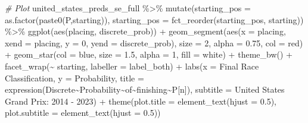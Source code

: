 \documentclass[
]{book}
\newenvironment{Shaded}{\begin{snugshade}}{\end{snugshade}}
\newcommand{\AttributeTok}[1]{\textcolor[rgb]{0.77,0.63,0.00}{#1}}
\newcommand{\CommentTok}[1]{\textcolor[rgb]{0.56,0.35,0.01}{\textit{#1}}}
\newcommand{\DecValTok}[1]{\textcolor[rgb]{0.00,0.00,0.81}{#1}}
\newcommand{\FloatTok}[1]{\textcolor[rgb]{0.00,0.00,0.81}{#1}}
\newcommand{\FunctionTok}[1]{\textcolor[rgb]{0.00,0.00,0.00}{#1}}
\newcommand{\NormalTok}[1]{#1}
\newcommand{\SpecialCharTok}[1]{\textcolor[rgb]{0.00,0.00,0.00}{#1}}
\newcommand{\StringTok}[1]{\textcolor[rgb]{0.31,0.60,0.02}{#1}}
\begin{document}
\begin{Shaded}
\begin{Highlighting}[]
\CommentTok{\# Plot}
\NormalTok{united\_states\_preds\_se\_full }\SpecialCharTok{\%\textgreater{}\%}
  \FunctionTok{mutate}\NormalTok{(}\AttributeTok{starting\_pos =} \FunctionTok{as.factor}\NormalTok{(}\FunctionTok{paste0}\NormalTok{(}\StringTok{\textquotesingle{}P\textquotesingle{}}\NormalTok{,starting)),}
         \AttributeTok{starting\_pos =} \FunctionTok{fct\_reorder}\NormalTok{(starting\_pos, starting)) }\SpecialCharTok{\%\textgreater{}\%}
  \FunctionTok{ggplot}\NormalTok{(}\FunctionTok{aes}\NormalTok{(placing, discrete\_prob)) }\SpecialCharTok{+}
  \FunctionTok{geom\_segment}\NormalTok{(}\FunctionTok{aes}\NormalTok{(}\AttributeTok{x =}\NormalTok{ placing, }\AttributeTok{xend =}\NormalTok{ placing, }\AttributeTok{y =} \DecValTok{0}\NormalTok{, }\AttributeTok{yend =}\NormalTok{ discrete\_prob),}
               \AttributeTok{size =} \DecValTok{2}\NormalTok{, }\AttributeTok{alpha =} \FloatTok{0.75}\NormalTok{, }\AttributeTok{col =} \StringTok{\textquotesingle{}red\textquotesingle{}}\NormalTok{) }\SpecialCharTok{+}
  \FunctionTok{geom\_star}\NormalTok{(}\AttributeTok{col =} \StringTok{\textquotesingle{}blue\textquotesingle{}}\NormalTok{, }\AttributeTok{size =} \FloatTok{1.5}\NormalTok{, }\AttributeTok{alpha =} \DecValTok{1}\NormalTok{, }\AttributeTok{fill =} \StringTok{\textquotesingle{}white\textquotesingle{}}\NormalTok{) }\SpecialCharTok{+}
  \FunctionTok{theme\_bw}\NormalTok{() }\SpecialCharTok{+}
  \FunctionTok{facet\_wrap}\NormalTok{(}\SpecialCharTok{\textasciitilde{}}\NormalTok{ starting, }\AttributeTok{labeller =}\NormalTok{ label\_both) }\SpecialCharTok{+}
  \FunctionTok{labs}\NormalTok{(}\AttributeTok{x =} \StringTok{\textquotesingle{}Final Race Classification\textquotesingle{}}\NormalTok{,}
       \AttributeTok{y =} \StringTok{\textquotesingle{}Probability\textquotesingle{}}\NormalTok{,}
       \AttributeTok{title =} \FunctionTok{expression}\NormalTok{(Discrete}\SpecialCharTok{\textasciitilde{}}\NormalTok{Probability}\SpecialCharTok{\textasciitilde{}}\NormalTok{of}\SpecialCharTok{\textasciitilde{}}\NormalTok{finishing}\SpecialCharTok{\textasciitilde{}}\NormalTok{P[n]),}
       \AttributeTok{subtitle =} \StringTok{\textquotesingle{}United States Grand Prix: 2014 {-} 2023\textquotesingle{}}\NormalTok{) }\SpecialCharTok{+}
  \FunctionTok{theme}\NormalTok{(}\AttributeTok{plot.title =} \FunctionTok{element\_text}\NormalTok{(}\AttributeTok{hjust =} \FloatTok{0.5}\NormalTok{),}
        \AttributeTok{plot.subtitle =} \FunctionTok{element\_text}\NormalTok{(}\AttributeTok{hjust =} \FloatTok{0.5}\NormalTok{)) }
\end{Highlighting}
\end{Shaded}
\end{document}
